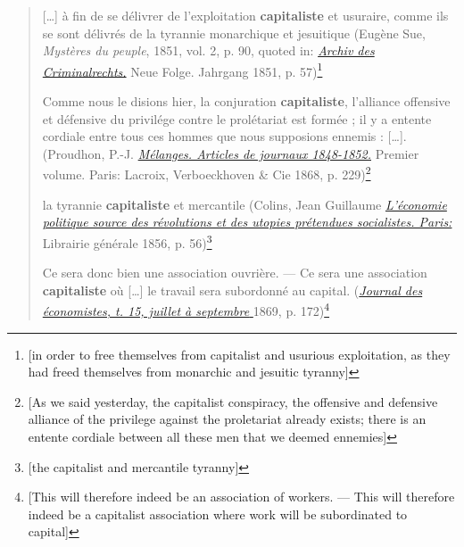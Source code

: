 \documentclass[output=paper]{langsci/langscibook}
\begin{document}
\begin{quote}
{[}\ldots{}{]} à fin de se délivrer de l'exploitation
\textbf{capitaliste} et usuraire, comme ils se sont délivrés de la
tyrannie monarchique et jesuitique (Eugène Sue, \emph{Mystères du
peuple}, 1851, vol. 2, p. 90, quoted in:
\href{https://books.google.at/books?id=F1BfAAAAcAAJ\&pg=RA1-PA57\&dq=\%
22exploitation+capitaliste\%22\&hl=de\&sa=X\&ved=
0ahUKEwj2z7q8_pjOAhWlJsAKHRGiDDgQ6AEILDAC}{
\emph{Archiv des Criminalrechts.}} Neue Folge. Jahrgang 1851, p.
57)\footnote{{[}in order to free themselves from capitalist and usurious
  exploitation, as they had freed themselves from monarchic and jesuitic
  tyranny{]}}

Comme nous le disions hier, la conjuration \textbf{capitaliste},
l'alliance offensive et défensive du privilége contre le prolétariat est
formée ; il y a entente cordiale entre tous ces hommes que nous
supposions ennemis : {[}\ldots{}{]}. (Proudhon, P.-J.
\href{https://books.google.at/books?id=OdvlnzjmD9EC\&pg=PA229\&dq=\%
22conjuration+capitaliste\%22\&hl=de\&sa=X\&ved=
0ahUKEwj1_qG9tZnOAhVTrRQKHZGtAsMQ6AEIMzAD}{\emph{Mélanges.
Articles de journaux 1848-1852.}} Premier volume. Paris: Lacroix,
Verboeckhoven \& Cie 1868, p. 229)\footnote{{[}As we said yesterday, the
  capitalist conspiracy, the offensive and defensive alliance of the
  privilege against the proletariat already exists; there is an entente
  cordiale between all these men that we deemed ennemies{]}}

la tyrannie \textbf{capitaliste} et mercantile (Colins, Jean Guillaume
\href{https://books.google.at/books?id=Gu0paho7pGYC\&pg=RA1-PA56\&dq=\%
22tyrannie+capitaliste\%22\&hl=de\&sa=X\&ved=0ahUKEwjdz-
vSwJnOAhUB2RoKHRjmBX8Q6AEIHDAA}{\emph{L'économie
politique source des révolutions et des utopies prétendues socialistes.
Paris:}} Librairie générale 1856, p. 56)\footnote{{[}the capitalist and
  mercantile tyranny{]}}

Ce sera donc bien une association ouvrière. --- Ce sera une association
\textbf{capitaliste} où {[}\ldots{}{]} le travail sera subordonné au
capital.
(\href{https://books.google.at/books?id=qgEcAQAAIAAJ\&pg=PA172\&dq=\%
22association+capitaliste\%22\&hl=de\&sa=X\&ved=
0ahUKEwiE9Zb8rpnOAhUHORoKHWm_CtoQ6AEIHjAA}{\emph{Journal
des économistes, t. 15, juillet à septembre }} 1869, p. 172)\footnote{{[}This
  will therefore indeed be an association of workers. --- This will
  therefore indeed be a capitalist association where work will be
  subordinated to capital{]}}
\end{quote}
\end{document}
